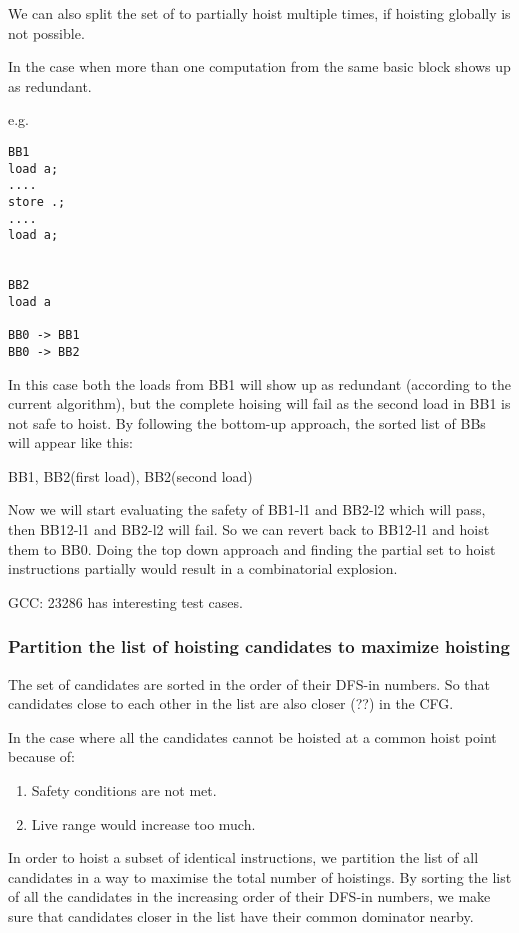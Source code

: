 \documentclass{sig-alternate}
\begin{document}
We can also split the set of to partially hoist multiple times, if
hoisting globally is not possible.

In the case when more than one computation from the same basic block
shows up as redundant.

e.g.
\begin{verbatim}
BB1
load a;
....
store .;
....
load a;


BB2
load a

BB0 -> BB1
BB0 -> BB2
\end{verbatim}

In this case both the loads from BB1 will show up as redundant
(according to the current algorithm), but the complete hoising will
fail as the second load in BB1 is not safe to hoist. By following the
bottom-up approach, the sorted list of BBs will appear like this:

{ BB1, BB2(first load), BB2(second load) }

Now we will start evaluating the safety of BB1-l1 and BB2-l2 which
will pass, then BB12-l1 and BB2-l2 will fail.  So we can revert back
to BB12-l1 and hoist them to BB0. Doing the top down approach and
finding the partial set to hoist instructions partially would result
in a combinatorial explosion.

GCC: 23286 has interesting test cases.

\subsubsection{Partition the list of hoisting candidates to maximize hoisting}
\label{subsec:partition}
The set of candidates are sorted in the order of their DFS-in
numbers. So that candidates close to each other in the list are also
closer (??) in the CFG.

In the case where all the candidates cannot be hoisted at a common
hoist point because of:
\begin{enumerate}
\item Safety conditions are not met.
\item Live range would increase too much.
\end{enumerate}

In order to hoist a subset of identical instructions, we partition the
list of all candidates in a way to maximise the total number of
hoistings.  By sorting the list of all the candidates in the
increasing order of their DFS-in numbers, we make sure that candidates
closer in the list have their common dominator nearby.
\end{document}
